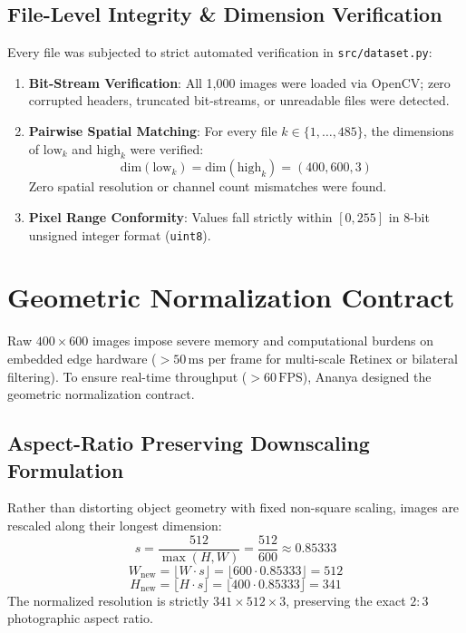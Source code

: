 \documentclass[journal]{IEEEtran}
\begin{document}
\subsection{File-Level Integrity \& Dimension Verification}
Every file was subjected to strict automated verification in \texttt{src/dataset.py}:
\begin{enumerate}
    \item \textbf{Bit-Stream Verification}: All 1,000 images were loaded via OpenCV; zero corrupted headers, truncated bit-streams, or unreadable files were detected.
    \item \textbf{Pairwise Spatial Matching}: For every file $k \in \{1, \dots, 485\}$, the dimensions of $\text{low}_k$ and $\text{high}_k$ were verified:
    \begin{equation}
        \text{dim}(\text{low}_k) = \text{dim}(\text{high}_k) = (400, 600, 3)
    \end{equation}
    Zero spatial resolution or channel count mismatches were found.
    \item \textbf{Pixel Range Conformity}: Values fall strictly within $[0, 255]$ in 8-bit unsigned integer format (\texttt{uint8}).
\end{enumerate}

\section{Geometric Normalization Contract}
Raw $400 \times 600$ images impose severe memory and computational burdens on embedded edge hardware ($> 50\,\text{ms}$ per frame for multi-scale Retinex or bilateral filtering). To ensure real-time throughput ($> 60\,\text{FPS}$), Ananya designed the geometric normalization contract.

\subsection{Aspect-Ratio Preserving Downscaling Formulation}
Rather than distorting object geometry with fixed non-square scaling, images are rescaled along their longest dimension:
\begin{equation}
    s = \frac{512}{\max(H, W)} = \frac{512}{600} \approx 0.85333
\end{equation}
\begin{equation}
    W_{\text{new}} = \lfloor W \cdot s \rfloor = \lfloor 600 \cdot 0.85333 \rfloor = 512
\end{equation}
\begin{equation}
    H_{\text{new}} = \lfloor H \cdot s \rfloor = \lfloor 400 \cdot 0.85333 \rfloor = 341
\end{equation}
The normalized resolution is strictly $341 \times 512 \times 3$, preserving the exact $2:3$ photographic aspect ratio.
\end{document}

